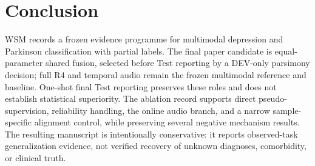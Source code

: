 \section{Conclusion}

WSM records a frozen evidence programme for multimodal depression and Parkinson classification with partial labels. The final paper candidate is equal-parameter shared fusion, selected before Test reporting by a DEV-only parsimony decision; full R4 and temporal audio remain the frozen multimodal reference and baseline. One-shot final Test reporting preserves these roles and does not establish statistical superiority. The ablation record supports direct pseudo-supervision, reliability handling, the online audio branch, and a narrow sample-specific alignment control, while preserving several negative mechanism results. The resulting manuscript is intentionally conservative: it reports observed-task generalization evidence, not verified recovery of unknown diagnoses, comorbidity, or clinical truth.
